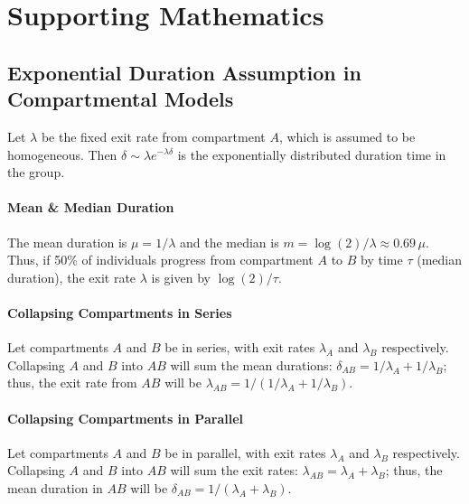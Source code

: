 \section{Supporting Mathematics}\label{app.model.math}
\subsection{Exponential Duration Assumption in Compartmental Models}\label{app.model.math.exp}
Let $\lambda$ be the fixed exit rate from compartment $A$, which is assumed to be homogeneous.
Then $\delta \sim \lambda e^{-\lambda \delta}$ is %
the exponentially distributed duration time in the group.
\paragraph{Mean \& Median Duration}
The mean duration is $\mu = 1/\lambda$ and the median is $m = \log(2)/\lambda \approx 0.69\,\mu$.
Thus, if 50\% of individuals progress from compartment $A$ to $B$ by time $\tau$ (median duration),
the exit rate $\lambda$ is given by $\log(2)/\tau$.
\paragraph{Collapsing Compartments in Series}
Let compartments $A$ and $B$ be in series, with exit rates $\lambda_A$ and $\lambda_B$ respectively.
Collapsing $A$ and $B$ into $AB$ will sum the mean durations: $\delta_{AB} = 1/\lambda_A + 1/\lambda_B$;
thus, the exit rate from $AB$ will be $\lambda_{AB} = 1/(1/\lambda_A + 1/\lambda_B)$.
\paragraph{Collapsing Compartments in Parallel}
Let compartments $A$ and $B$ be in parallel, with exit rates $\lambda_A$ and $\lambda_B$ respectively.
Collapsing $A$ and $B$ into $AB$ will sum the exit rates: $\lambda_{AB} = \lambda_A + \lambda_B$;
thus, the mean duration in $AB$ will be $\delta_{AB} = 1/(\lambda_A + \lambda_B)$.
